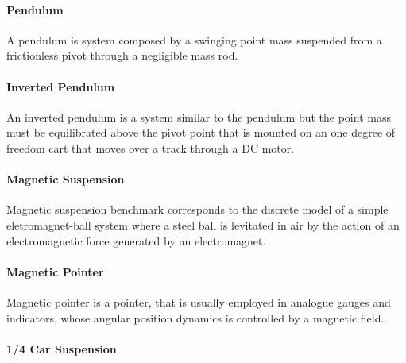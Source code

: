 \documentclass[twocolumn]{autart}    %
\begin{document}
\paragraph*{Pendulum}

A pendulum is system composed by a swinging point mass suspended from 
a frictionless pivot through a negligible mass rod.

\paragraph*{Inverted Pendulum}

An inverted pendulum is a system similar to the pendulum but the point 
mass must be equilibrated above the pivot point that is mounted on an 
one degree of freedom cart that moves over a track through a DC motor.

\paragraph*{Magnetic Suspension}

Magnetic suspension benchmark corresponds to the discrete model of a 
simple eletromagnet-ball system where a steel ball is levitated in air 
by the action of an electromagnetic force generated by an electromagnet.

\paragraph*{Magnetic Pointer}

Magnetic pointer is a pointer, that is usually employed in analogue 
gauges and indicators, whose angular position dynamics is controlled 
by a magnetic field.


\paragraph*{1/4 Car Suspension}
\end{document}

